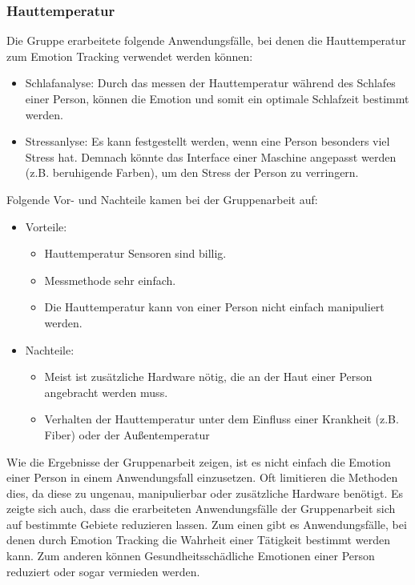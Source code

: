 \subsubsection{Hauttemperatur}
Die Gruppe erarbeitete folgende Anwendungsfälle, bei denen die Hauttemperatur zum Emotion Tracking verwendet werden können:
\begin{itemize}
	\item Schlafanalyse: Durch das messen der Hauttemperatur während des Schlafes einer Person, können die Emotion  und somit ein optimale Schlafzeit bestimmt werden.
	\item Stressanlyse: Es kann festgestellt werden, wenn eine Person besonders viel Stress hat. Demnach könnte das Interface einer Maschine angepasst werden (z.B. beruhigende Farben), um den Stress der Person zu verringern.
\end{itemize}
Folgende Vor- und Nachteile kamen bei der Gruppenarbeit auf:
\begin{itemize}
	\item Vorteile:
	\begin{itemize}
		\item Hauttemperatur Sensoren sind billig.
		\item Messmethode sehr einfach.	 
		\item Die Hauttemperatur kann von einer Person nicht einfach manipuliert werden.
	\end{itemize}
	\item Nachteile:
	\begin{itemize}
		\item Meist ist zusätzliche Hardware nötig, die an der Haut einer Person angebracht werden muss.
		\item Verhalten der Hauttemperatur unter dem Einfluss einer Krankheit (z.B. Fiber) oder der Außentemperatur
	\end{itemize}
\end{itemize}

Wie die Ergebnisse der Gruppenarbeit zeigen, ist es nicht einfach die Emotion einer Person in einem Anwendungsfall einzusetzen. Oft limitieren die Methoden dies, da diese zu ungenau, manipulierbar oder zusätzliche Hardware benötigt. Es zeigte sich auch, dass die erarbeiteten Anwendungsfälle der Gruppenarbeit sich auf bestimmte Gebiete reduzieren lassen. Zum einen gibt es Anwendungsfälle, bei denen durch Emotion Tracking die Wahrheit einer Tätigkeit bestimmt werden kann. Zum anderen können Gesundheitsschädliche Emotionen einer Person reduziert oder sogar vermieden werden. 

